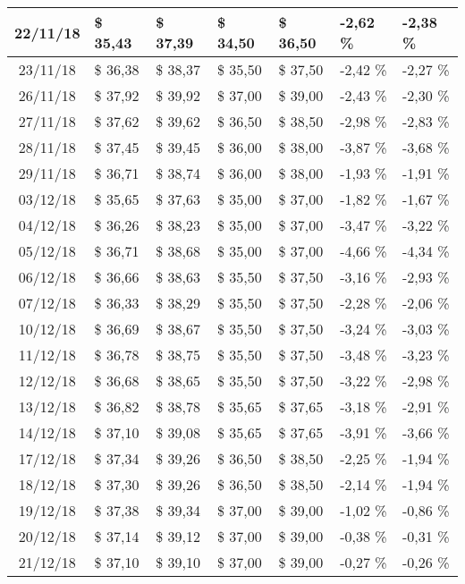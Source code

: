 \begin{center}
\begin{longtable}{|c|p{1.5cm}|p{1.5cm}|p{1.5cm}|p{1.5cm}|p{1.5cm}|p{1.5cm}|}
22/11/18 & \$ 35,43 & \$ 37,39 & \$ 34,50 & \$ 36,50 & -2,62 \% & -2,38 \% \\ \hline
23/11/18 & \$ 36,38 & \$ 38,37 & \$ 35,50 & \$ 37,50 & -2,42 \% & -2,27 \% \\ \hline
26/11/18 & \$ 37,92 & \$ 39,92 & \$ 37,00 & \$ 39,00 & -2,43 \% & -2,30 \% \\ \hline
27/11/18 & \$ 37,62 & \$ 39,62 & \$ 36,50 & \$ 38,50 & -2,98 \% & -2,83 \% \\ \hline
28/11/18 & \$ 37,45 & \$ 39,45 & \$ 36,00 & \$ 38,00 & -3,87 \% & -3,68 \% \\ \hline
29/11/18 & \$ 36,71 & \$ 38,74 & \$ 36,00 & \$ 38,00 & -1,93 \% & -1,91 \% \\ \hline
03/12/18 & \$ 35,65 & \$ 37,63 & \$ 35,00 & \$ 37,00 & -1,82 \% & -1,67 \% \\ \hline
04/12/18 & \$ 36,26 & \$ 38,23 & \$ 35,00 & \$ 37,00 & -3,47 \% & -3,22 \% \\ \hline
05/12/18 & \$ 36,71 & \$ 38,68 & \$ 35,00 & \$ 37,00 & -4,66 \% & -4,34 \% \\ \hline
06/12/18 & \$ 36,66 & \$ 38,63 & \$ 35,50 & \$ 37,50 & -3,16 \% & -2,93 \% \\ \hline
07/12/18 & \$ 36,33 & \$ 38,29 & \$ 35,50 & \$ 37,50 & -2,28 \% & -2,06 \% \\ \hline
10/12/18 & \$ 36,69 & \$ 38,67 & \$ 35,50 & \$ 37,50 & -3,24 \% & -3,03 \% \\ \hline
11/12/18 & \$ 36,78 & \$ 38,75 & \$ 35,50 & \$ 37,50 & -3,48 \% & -3,23 \% \\ \hline
12/12/18 & \$ 36,68 & \$ 38,65 & \$ 35,50 & \$ 37,50 & -3,22 \% & -2,98 \% \\ \hline
13/12/18 & \$ 36,82 & \$ 38,78 & \$ 35,65 & \$ 37,65 & -3,18 \% & -2,91 \% \\ \hline
14/12/18 & \$ 37,10 & \$ 39,08 & \$ 35,65 & \$ 37,65 & -3,91 \% & -3,66 \% \\ \hline
17/12/18 & \$ 37,34 & \$ 39,26 & \$ 36,50 & \$ 38,50 & -2,25 \% & -1,94 \% \\ \hline
18/12/18 & \$ 37,30 & \$ 39,26 & \$ 36,50 & \$ 38,50 & -2,14 \% & -1,94 \% \\ \hline
19/12/18 & \$ 37,38 & \$ 39,34 & \$ 37,00 & \$ 39,00 & -1,02 \% & -0,86 \% \\ \hline
20/12/18 & \$ 37,14 & \$ 39,12 & \$ 37,00 & \$ 39,00 & -0,38 \% & -0,31 \% \\ \hline
21/12/18 & \$ 37,10 & \$ 39,10 & \$ 37,00 & \$ 39,00 & -0,27 \% & -0,26 \% \\ \hline

\end{longtable}
\end{center}
